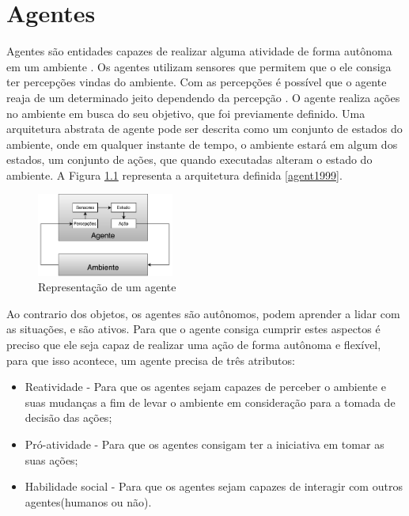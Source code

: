 \chapter{\label{chap:agentes}Agentes}


Agentes são entidades capazes de realizar alguma atividade de forma autônoma em um ambiente \cite{agente-oriented1993}. Os agentes utilizam sensores que permitem que o ele consiga ter percepções vindas do ambiente. Com as percepções é possível que o agente reaja de um determinado jeito dependendo da percepção \cite{intelligence2003modern}. O agente realiza ações no ambiente em busca do seu objetivo, que foi previamente definido. Uma arquitetura abstrata de agente pode ser descrita como um conjunto de estados do ambiente, onde em qualquer instante de tempo, o ambiente estará em algum dos estados, um conjunto de ações, que quando executadas alteram o estado do ambiente. A Figura \ref{fig:agente} representa a arquitetura definida \ref{agent1999}. 

\begin{figure}[ht]
	\centering
	\includegraphics[width=0.4\textwidth]{fig/agente.pdf}
	\caption{Representação de um agente}
	\label{fig:agente}
\end{figure} 

Ao contrario dos objetos, os agentes são autônomos, podem aprender a lidar com as situações, e são ativos. Para que o agente consiga cumprir estes aspectos é preciso que ele seja capaz de realizar uma ação de forma autônoma e flexível, para que isso acontece, um agente precisa de três atributos\cite{agent1999}: 

\begin{itemize}
	\item Reatividade - Para que os agentes sejam capazes de perceber o ambiente e suas mudanças a fim de levar o ambiente em consideração para a tomada de decisão das ações;
	\item Pró-atividade - Para que os agentes consigam ter a iniciativa em tomar as suas ações;
	\item Habilidade social - Para que os agentes sejam capazes de interagir com outros agentes(humanos ou não).
\end{itemize}

